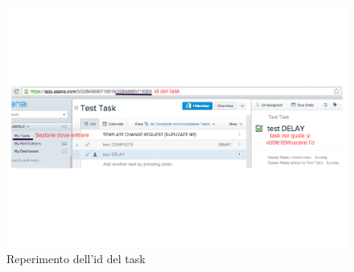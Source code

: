 				\begin{figure}[htbp]
					\centering
					\includegraphics[width=14cm]{images/select_id_task_asana.pdf}
					\caption{Reperimento dell'id del task}
					\label{fig:select_id_task_asana}				
				\end{figure}
			
